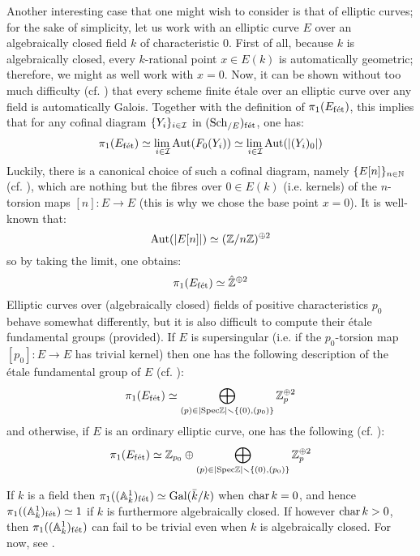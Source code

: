 \begin{example}
            Another interesting case that one might wish to consider is that of elliptic curves; for the sake of simplicity, let us work with an elliptic curve $E$ over an algebraically closed field $k$ of characteristic $0$. First of all, because $k$ is algebraically closed, every $k$-rational point $x \in E(k)$ is automatically geometric; therefore, we might as well work with $x = 0$. Now, it can be shown without too much difficulty (cf. \cite[Proposition 5.11]{kundu_etale_fundamental_group_of_elliptic_curves}) that every scheme finite \'etale over an elliptic curve over any field is automatically Galois. Together with the definition of $\pi_1(E_{\mathrm{f\acute{e}t}})$, this implies that for any cofinal diagram $\{Y_i\}_{i \in \mathcal{I}}$ in $(\mathrm{Sch}_{/E})_{\mathrm{f\acute{e}t}}$, one has:
                $$\pi_1(E_{\mathrm{f\acute{e}t}}) \simeq \underset{i \in \mathcal{I}}{\operatorname{lim} \:} \mathrm{Aut}(F_0(Y_i)) \simeq \underset{i \in \mathcal{I}}{\operatorname{lim} \:} \mathrm{Aut}(|(Y_i)_0|)$$
            Luckily, there is a canonical choice of such a cofinal diagram, namely $\{E[n]\}_{n \in \mathbb{N}}$ (cf. \cite[Proposition 3.8]{kundu_etale_fundamental_group_of_elliptic_curves}), which are nothing but the fibres over $0 \in E(k)$ (i.e. kernels) of the $n$-torsion maps $[n]: E \to E$ (this is why we chose the base point $x = 0$). It is well-known that:
                $$\mathrm{Aut}(|E[n]|) \simeq (\mathbb{Z}/n\mathbb{Z})^{\oplus 2}$$
            so by taking the limit, one obtains:
                $$\pi_1(E_{\mathrm{f\acute{e}t}}) \simeq \hat{\mathbb{Z}}^{\oplus 2}$$
            Elliptic curves over (algebraically closed) fields of positive characteristics $p_0$ behave somewhat differently, but it is also difficult to compute their \'etale fundamental groups (provided). If $E$ is supersingular (i.e. if the $p_0$-torsion map $[p_0]: E \to E$ has trivial kernel) then one has the following description of the \'etale fundamental group of $E$ (cf. \cite[Proposition 5.13]{kundu_etale_fundamental_group_of_elliptic_curves}):
                $$\pi_1(E_{\mathrm{f\acute{e}t}}) \simeq \bigoplus_{(p) \in |\mathrm{Spec} \mathbb{Z}| \smallsetminus \{(0), (p_0)\}} \mathbb{Z}_p^{\oplus 2}$$
            and otherwise, if $E$ is an ordinary elliptic curve, one has the following (cf. \cite[Proposition 5.14]{kundu_etale_fundamental_group_of_elliptic_curves}):
                $$\pi_1(E_{\mathrm{f\acute{e}t}}) \simeq \mathbb{Z}_{p_0} \oplus \bigoplus_{(p) \in |\mathrm{Spec} \mathbb{Z}| \smallsetminus \{(0), (p_0)\}} \mathbb{Z}_p^{\oplus 2}$$
        \end{example}
        \begin{example} \label{example: etale_fundamental_group_of_the_affine_line}
            If $k$ is a field then $\pi_1((\mathbb{A}^1_k)_{\mathrm{f\acute{e}t}}) \simeq \mathrm{Gal}(\bar{k}/k)$ when $\operatorname{char} k = 0$, and hence $\pi_1((\mathbb{A}^1_k)_{\mathrm{f\acute{e}t}}) \simeq 1$ if $k$ is furthermore algebraically closed. If however $\operatorname{char} k > 0$, then $\pi_1((\mathbb{A}^1_k)_{\mathrm{f\acute{e}t}})$ can fail to be trivial even when $k$ is algebraically closed. For now, see \cite[Theorem 6.13, Remark 6.23, and Exercises 6.28 and 6.29]{lenstra_1985_galois_theory_for_schemes}.
        \end{example}
        
